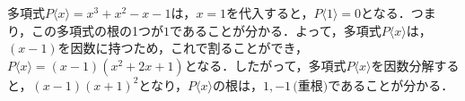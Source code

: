 \begin{example*}
	多項式$P\langle x\rangle = x^3+x^2-x-1$は，$x = 1$を代入すると，$P\langle 1\rangle = 0$となる．つまり，この多項式の根の1つが$1$であることが分かる．よって，多項式$P\langle x\rangle$は，$(x-1)$を因数に持つため，これで割ることができ，$P\langle x\rangle = (x-1)(x^2+2x+1)$となる．したがって，多項式$P\langle x\rangle$を因数分解すると，$(x-1)(x+1)^2$となり，$P\langle x\rangle$の根は，$1, -1\,\text{(重根)}$であることが分かる．
\end{example*}

